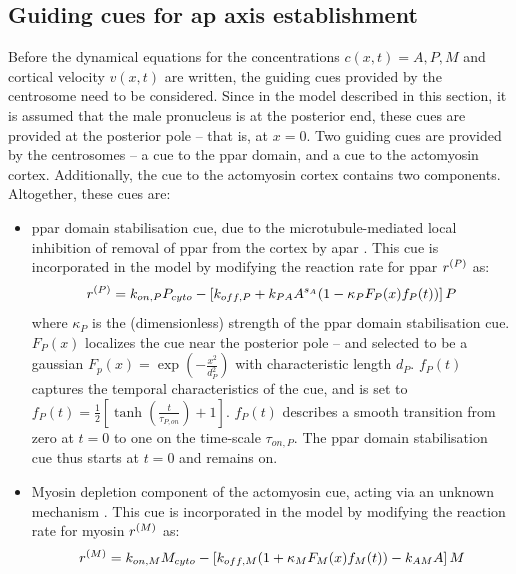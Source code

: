 \subsection{Guiding cues for \acs{ap} axis establishment}\label{subsec:guidingCuesModelPG}
Before the dynamical equations for the concentrations $c(x,t) = A,P,M$ and cortical velocity $v(x,t)$ are written, the guiding cues provided by the centrosome need to be considered. Since in the model described in this section, it is assumed that the male pronucleus is at the posterior end, these cues are provided at the posterior pole -- that is, at $x = 0$. Two guiding cues are provided by the centrosomes -- a cue to the \ac{ppar} domain, and a cue to the actomyosin cortex. Additionally, the cue to the actomyosin cortex contains two components. Altogether, these cues are:
\begin{itemize}
    \item \ac{ppar} domain stabilisation cue, due to the microtubule-mediated local inhibition of removal of \ac{ppar} from the cortex by \ac{apar} \citep{motegi2011microtubules}. This cue is incorporated in the model by modifying the reaction rate for \ac{ppar} $r^{(P)}$ as:
    \begin{equation}\label{eq:pparChemicalRateWithCueModelPG}
        r^{(P)} = k_{on,P}P_{cyto} - \left[k_{off,P} + k_{PA}A^{s_A}(1 - \kappa_PF_P(x)f_P(t))\right]P
    \end{equation}
    where $\kappa_P$ is the (dimensionless) strength of the \ac{ppar} domain stabilisation cue. $F_P(x)$ localizes the cue near the posterior pole -- and selected to be a gaussian $F_p(x) = \exp(-\frac{x^2}{d_P^2})$ with characteristic length $d_P$. $f_P(t)$ captures the temporal characteristics of the cue, and is set to $f_P(t) = \frac{1}{2}\left[\tanh(\frac{t}{\tau_{P,on}}) + 1\right]$. $f_P(t)$ describes a smooth transition from zero at $t = 0$ to one on the time-scale $\tau_{on,P}$. The \ac{ppar} domain stabilisation cue thus starts at $t = 0$ and remains on.
    \item Myosin depletion component of the actomyosin cue, acting via an unknown mechanism \citep{motegi2006sequential}. This cue is incorporated in the model by modifying the reaction rate for myosin $r^{(M)}$ as:
    \begin{equation}\label{eq:myosinChemicalRateWithCueModelPG}
        r^{(M)} = k_{on,M}M_{cyto} - \left[k_{off,M}(1 + \kappa_MF_M(x)f_M(t)) - k_{AM}A\right]M
    \end{equation}

\end{itemize}
